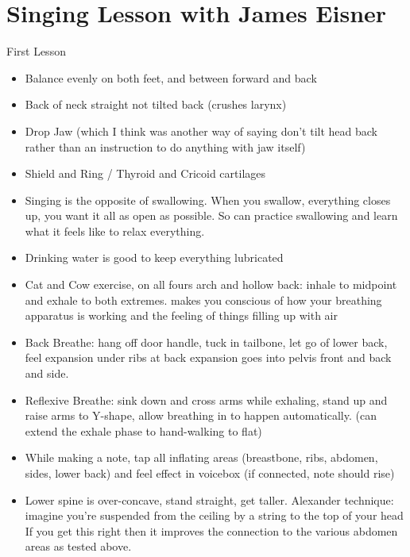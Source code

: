 \documentclass[14pt,a4paper]{memoir}
\begin{document}
\chapter*{Singing Lesson with James Eisner}

First Lesson

\begin{itemize}
\item Balance evenly on both feet, and between forward and back

\item Back of neck straight not tilted back (crushes larynx)

\item Drop Jaw (which I think was another way of saying don't tilt head back rather than an instruction to do anything with jaw itself)

\item Shield and Ring / Thyroid and Cricoid cartilages

\item Singing is the opposite of swallowing. When you swallow, everything closes up, you want it all as open as possible.
So can practice swallowing and learn what it feels like to relax everything.

\item Drinking water is good to keep everything lubricated

\item Cat and Cow exercise, on all fours arch and hollow back: inhale to midpoint and exhale to both extremes.
makes you conscious of how your breathing apparatus is working and the feeling of things filling up with air

\item Back Breathe: hang off door handle, tuck in tailbone, let go of lower back, feel expansion under ribs at back
expansion goes into pelvis front and back and side. 

\item Reflexive Breathe: sink down and cross arms while exhaling, stand up and raise arms to Y-shape, allow breathing in to happen automatically. (can extend the exhale phase to hand-walking to flat)
  
\item While making a note, tap all inflating areas (breastbone, ribs, abdomen, sides, lower back) and feel effect in voicebox (if connected, note should rise)
  
\item Lower spine is over-concave, stand straight, get taller.
Alexander technique: imagine you're suspended from the ceiling by a string to the top of your head
If you get this right then it improves the connection to the various abdomen areas as tested above.


\end{itemize}
\end{document}
